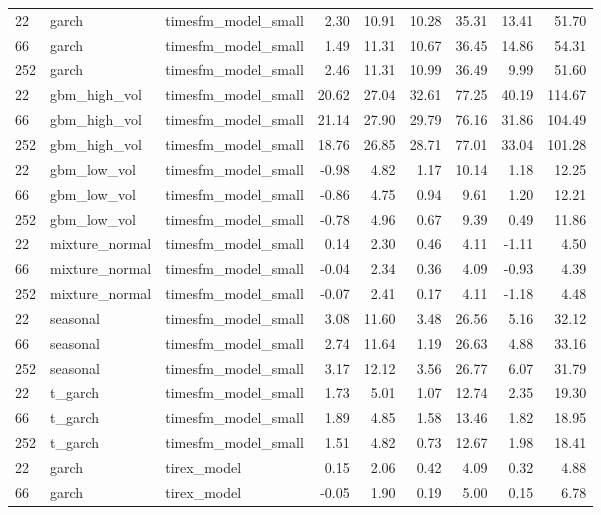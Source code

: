 {\begin{tabular}{lllrrrrrr}
\midrule
22 & garch & timesfm\_model\_small & 2.30 & 10.91 & 10.28 & 35.31 & 13.41 & 51.70 \\
66 & garch & timesfm\_model\_small & 1.49 & 11.31 & 10.67 & 36.45 & 14.86 & 54.31 \\
252 & garch & timesfm\_model\_small & 2.46 & 11.31 & 10.99 & 36.49 & 9.99 & 51.60 \\
\midrule
22 & gbm\_high\_vol & timesfm\_model\_small & 20.62 & 27.04 & 32.61 & 77.25 & 40.19 & 114.67 \\
66 & gbm\_high\_vol & timesfm\_model\_small & 21.14 & 27.90 & 29.79 & 76.16 & 31.86 & 104.49 \\
252 & gbm\_high\_vol & timesfm\_model\_small & 18.76 & 26.85 & 28.71 & 77.01 & 33.04 & 101.28 \\
\midrule
22 & gbm\_low\_vol & timesfm\_model\_small & -0.98 & 4.82 & 1.17 & 10.14 & 1.18 & 12.25 \\
66 & gbm\_low\_vol & timesfm\_model\_small & -0.86 & 4.75 & 0.94 & 9.61 & 1.20 & 12.21 \\
252 & gbm\_low\_vol & timesfm\_model\_small & -0.78 & 4.96 & 0.67 & 9.39 & 0.49 & 11.86 \\
\midrule
22 & mixture\_normal & timesfm\_model\_small & 0.14 & 2.30 & 0.46 & 4.11 & -1.11 & 4.50 \\
66 & mixture\_normal & timesfm\_model\_small & -0.04 & 2.34 & 0.36 & 4.09 & -0.93 & 4.39 \\
252 & mixture\_normal & timesfm\_model\_small & -0.07 & 2.41 & 0.17 & 4.11 & -1.18 & 4.48 \\
\midrule
22 & seasonal & timesfm\_model\_small & 3.08 & 11.60 & 3.48 & 26.56 & 5.16 & 32.12 \\
66 & seasonal & timesfm\_model\_small & 2.74 & 11.64 & 1.19 & 26.63 & 4.88 & 33.16 \\
252 & seasonal & timesfm\_model\_small & 3.17 & 12.12 & 3.56 & 26.77 & 6.07 & 31.79 \\
\midrule
22 & t\_garch & timesfm\_model\_small & 1.73 & 5.01 & 1.07 & 12.74 & 2.35 & 19.30 \\
66 & t\_garch & timesfm\_model\_small & 1.89 & 4.85 & 1.58 & 13.46 & 1.82 & 18.95 \\
252 & t\_garch & timesfm\_model\_small & 1.51 & 4.82 & 0.73 & 12.67 & 1.98 & 18.41 \\
\midrule
22 & garch & tirex\_model & 0.15 & 2.06 & 0.42 & 4.09 & 0.32 & 4.88 \\
66 & garch & tirex\_model & -0.05 & 1.90 & 0.19 & 5.00 & 0.15 & 6.78 \\

\end{tabular}}

